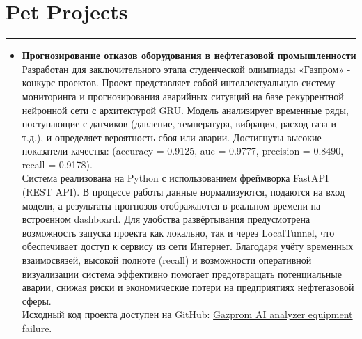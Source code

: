 \documentclass[a4paper,14pt]{article}
\begin{document}
\section*{Pet Projects}
\hrule
\vspace{0.5em}
\begin{itemize}

\item \textbf{Прогнозирование отказов оборудования в нефтегазовой промышленности} \\
Разработан для заключительного этапа студенческой олимпиады «Газпром» - конкурс проектов.
Проект представляет собой интеллектуальную систему мониторинга и прогнозирования аварийных ситуаций на
базе рекуррентной нейронной сети с архитектурой GRU. Модель анализирует временные ряды, поступающие с датчиков
(давление, температура, вибрация, расход газа и т.д.), и определяет вероятность сбоя или аварии.
Достигнуты высокие показатели качества: (accuracy = 0.9125, auc = 0.9777, precision = 0.8490, recall = 0.9178). \\[0.3em]
Система реализована на Python с использованием фреймворка FastAPI (REST API). В процессе работы данные нормализуются,
подаются на вход модели, а результаты прогнозов отображаются в реальном времени на встроенном dashboard.
Для удобства развёртывания предусмотрена возможность запуска проекта как локально, так и через LocalTunnel,
что обеспечивает доступ к сервису из сети Интернет.
Благодаря учёту временных взаимосвязей, высокой полноте (recall) и возможности оперативной визуализации система эффективно помогает
предотвращать потенциальные аварии, снижая риски и экономические потери на предприятиях нефтегазовой сферы. \\[0.3em]
Исходный код проекта доступен на GitHub:
\href{https://github.com/Denigmma/Gazprom_AI_analyzer_equipment_failure}{Gazprom AI analyzer equipment failure}.




\end{itemize}
\end{document}
